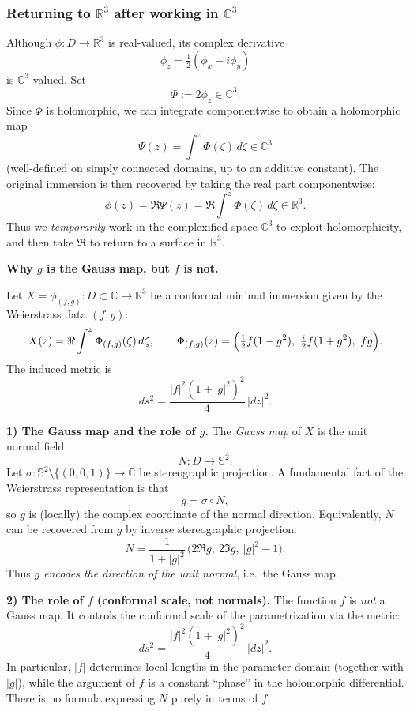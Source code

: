 \documentclass[12pt,a4paper]{article}
\theoremstyle{plain}
\theoremstyle{definition}      %
\begin{document}
\medskip

\subsubsection*{Returning to $\mathbb R^3$ after working in $\mathbb C^3$}
Although $\phi:D\to\mathbb R^3$ is real-valued, its complex derivative
\[
\phi_z=\tfrac12(\phi_x-i\phi_y)
\]
is $\mathbb C^3$-valued. Set
\[
\Phi:=2\phi_z \in \mathbb C^3.
\]
Since $\Phi$ is holomorphic, we can integrate componentwise to obtain a holomorphic map
\[
\Psi(z)=\int^z \Phi(\zeta)\,d\zeta \in \mathbb C^3
\]
(well-defined on simply connected domains, up to an additive constant). The original immersion is then recovered by taking
the real part componentwise:
\[
\phi(z)=\Re \Psi(z)=\Re\int^z \Phi(\zeta)\,d\zeta \in \mathbb R^3.
\]
Thus we \emph{temporarily} work in the complexified space $\mathbb C^3$ to exploit holomorphicity, and then take $\Re$ to
return to a surface in $\mathbb R^3$.

	
	\medskip
	\textbf{Why $g$ is the Gauss map, but $f$ is not.}
	
	Let $X=\phi_{(f,g)}:D\subset\mathbb C\to\mathbb R^3$ be a conformal minimal immersion given by the Weierstrass data $(f,g)$:
	\[
	X(z)=\Re\int^z \Phi_{(f,g)}(\zeta)\,d\zeta,
	\qquad
	\Phi_{(f,g)}(z)
	=
	\Bigl(\tfrac12 f(1-g^2),\ \tfrac{i}{2}f(1+g^2),\ fg\Bigr).
	\]
	The induced metric is
	\[
	ds^2=\frac{|f|^2(1+|g|^2)^2}{4}\,|dz|^2.
	\]
	
	\smallskip
	\textbf{1) The Gauss map and the role of $g$.}
	The \emph{Gauss map} of $X$ is the unit normal field
	\[
	N:D\to \mathbb S^2.
	\]
	Let $\sigma:\mathbb S^2\setminus\{(0,0,1)\}\to\mathbb C$ be stereographic projection. A fundamental fact of the Weierstrass
	representation is that
	\[
	g=\sigma\circ N,
	\]
	so $g$ is (locally) the complex coordinate of the normal direction. Equivalently, $N$ can be recovered from $g$ by inverse
	stereographic projection:
	\[
	N
	=
	\frac{1}{1+|g|^2}\,\bigl(2\Re g,\ 2\Im g,\ |g|^2-1\bigr).
	\]
	Thus \emph{$g$ encodes the direction of the unit normal}, i.e.\ the Gauss map.
	
	\smallskip
	\textbf{2) The role of $f$ (conformal scale, not normals).}
	The function $f$ is \emph{not} a Gauss map. It controls the conformal scale of the parametrization via the metric:
	\[
	ds^2=\frac{|f|^2(1+|g|^2)^2}{4}\,|dz|^2.
	\]
	In particular, $|f|$ determines local lengths in the parameter domain (together with $|g|$), while the argument of $f$ is a
	constant ``phase'' in the holomorphic differential. There is no formula expressing $N$ purely in terms of $f$.
	
\end{document}

